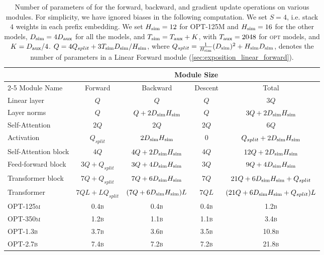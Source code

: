 \begin{table}[t]
  \centering
  \caption{Number of parameters of \simulator{}  for the forward, backward, and gradient update operations on various modules. For simplicity, we have ignored biases in the following computation. We set $S=4$, i.e. stack $4$ weights in each prefix embedding. We set $H_{\text{sim}}=12$ for \textsc{OPT-125M} and $H_{\text{sim}}=16$ for the other models, $D_{\text{sim}} = 4 D_{\text{aux}}$ for all the models, and $T_{\text{sim}} = T_{\text{aux}} + K$, with $T_{\text{aux}}=2048$ for \textsc{opt} models, and $K=D_{\text{aux}}/4$. $Q=4 Q_{ split} + 3 T_{\text{sim}} D_{\text{sim}} / H_{\text{sim}} $, where $Q_{ split } = \frac{1}{ H_{\text{sim}} }(  D_{\text{sim}} )^2 +  H_{\text{sim}} D_{\text{sim}}$,  denotes the number of parameters in a \simulator{} Linear Forward module (\cref{sec:exposition_linear_forward}). %
  }
  \label{tab:construction}
  \begin{tabular}{lcccc}
    \toprule
    & \multicolumn{4}{c}{Module Size} \\ \cmidrule(lr){2-5} 
    Module Name & Forward & Backward & Descent  & Total \\
    \midrule
    Linear layer  & $Q$ & $Q$ & $Q$  & $3Q$\\
    Layer norms & $Q$ & $Q + 2 D_{\text{sim}} H_{\text{sim}}$ & $Q$ & $3Q + 2 D_{\text{sim}} H_{\text{sim}}$\\
    Self-Attention  & $2Q$ & $2Q$ & $2Q$  & $6Q$\\
    Activation & $Q_{ split }$ & $2 D_{\text{sim}} H_{\text{sim}} $ & $0$ & $Q_{ split } + 2 D_{\text{sim}} H_{\text{sim}}$\\ \midrule
    Self-Attention block & $4Q$ &  $ 4Q+ 2D_{\text{sim}} H_{\text{sim}} $  & $ 4 Q $ & $ 12Q + 2D_{\text{sim}} H_{\text{sim}} $ \\
    Feed-forward block & $3Q+Q_{ split }$ & $ 3Q + 4D_{\text{sim}} H_{\text{sim}} $ & $ 3 Q $  & $ 9Q + 4D_{\text{sim}} H_{\text{sim}} $\\
    Transformer block & $7Q+Q_{ split }$ & $7Q + 6D_{\text{sim}} H_{\text{sim}}$ & $7Q$ & $ 21Q + 6D_{\text{sim}} H_{\text{sim}}+Q_{ split } $\\
    Transformer & $7QL + LQ_{ split }$ & $(7Q + 6 D_{\text{sim}} H_{\text{sim}})L$ & $7QL$ &  $ (21Q + 6D_{\text{sim}} H_{\text{sim}}+Q_{ split })L $ \\ %
    \midrule
    \textsc{OPT-125m} & \textsc{0.4b} & \textsc{0.4b} & \textsc{0.4b} & \textsc{1.2b}       \\
    \textsc{OPT-350m} & \textsc{1.2b} & \textsc{1.1b} &  \textsc{1.1b} & \textsc{3.4b}       \\
    \textsc{OPT-1.3b} &  \textsc{3.7b}   &  \textsc{3.6b}   &    \textsc{3.5b} & \textsc{10.8b}  \\
    \textsc{OPT-2.7b} & \textsc{7.4b}   &  \textsc{7.2b}   &    \textsc{7.2b} & \textsc{21.8b}\\
    \bottomrule
  \end{tabular}
\end{table}

